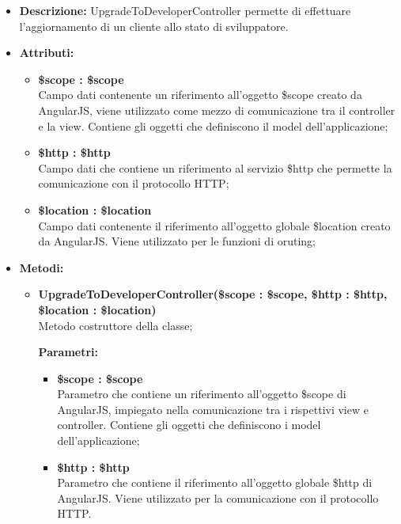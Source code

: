 \begin{itemize}
	\item \textbf{Descrizione:} UpgradeToDeveloperController permette di effettuare l'aggiornamento di un cliente allo stato di sviluppatore.
	\item \textbf{Attributi:}
	\begin{itemize}
		
		\item \textbf{\$scope : \$scope}\\
		Campo dati contenente un riferimento all'oggetto \$scope creato da AngularJS, viene utilizzato come mezzo di comunicazione tra il controller e la view. Contiene gli oggetti che definiscono il model dell'applicazione;
		
		\item \textbf{\$http : \$http }\\
		Campo dati che contiene un riferimento al servizio \$http che permette la comunicazione con il protocollo HTTP;
		
		\item \textbf{\$location : \$location }\\
		Campo dati contenente il riferimento all'oggetto globale \$location creato da AngularJS. Viene utilizzato per le funzioni di oruting;
		
		
	\end{itemize}
	\item \textbf{Metodi:}
	\begin{itemize}
		
		\item \textbf{UpgradeToDeveloperController(\$scope : \$scope, \$http : \$http, \$location : \$location)}\\
		Metodo costruttore della classe;
		\begin{description}
			\item[\textbf{Parametri:}]
		\end{description}
		\begin{itemize}
			\item \textbf{\$scope : \$scope}\\
			Parametro che contiene un riferimento all'oggetto \$scope di AngularJS, impiegato nella comunicazione tra i rispettivi view e controller. Contiene gli oggetti che definiscono i model dell'applicazione;
			
			\item \textbf{\$http : \$http}\\
			Parametro che contiene il riferimento all'oggetto globale \$http di AngularJS. Viene utilizzato per la comunicazione con il protocollo HTTP.
			

\end{itemize}
\end{itemize}
\end{itemize}
